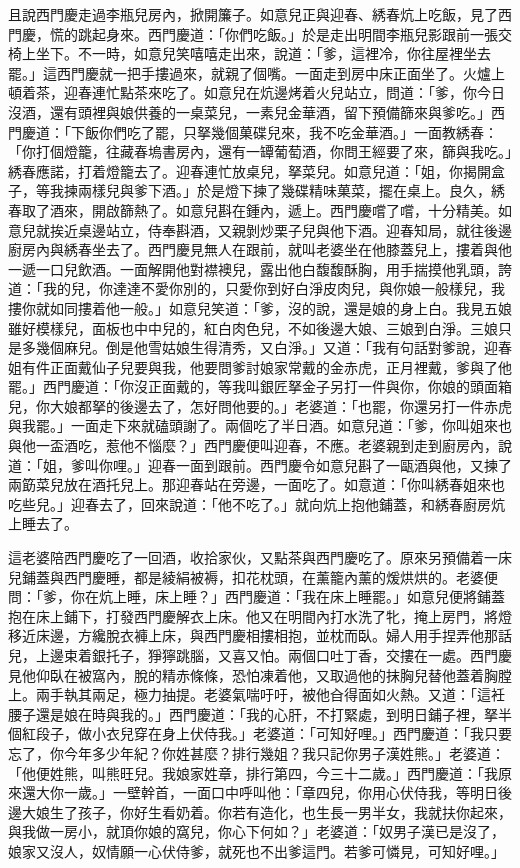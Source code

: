 且說西門慶走過李瓶兒房內，掀開簾子。如意兒正與迎春、綉春炕上吃飯，見了西門慶，慌的跳起身來。西門慶道：「你們吃飯。」於是走出明間李瓶兒影跟前一張交椅上坐下。不一時，如意兒笑嘻嘻走出來，說道：「爹，這裡冷，你往屋裡坐去罷。」這西門慶就一把手摟過來，就親了個嘴。一面走到房中床正面坐了。火爐上頓着茶，迎春連忙點茶來吃了。如意兒在炕邊烤着火兒站立，問道：「爹，你今日沒酒，還有頭裡與娘供養的一桌菜兒，一素兒金華酒，留下預備篩來與爹吃。」西門慶道：「下飯你們吃了罷，只拏幾個菓碟兒來，我不吃金華酒。」一面教綉春：「你打個燈籠，往藏春塢書房內，還有一罈葡萄酒，你問王經要了來，篩與我吃。」綉春應諾，打着燈籠去了。迎春連忙放桌兒，拏菜兒。如意兒道：「姐，你揭開盒子，等我揀兩樣兒與爹下酒。」於是燈下揀了幾碟精味菓菜，擺在桌上。良久，綉春取了酒來，開啟篩熱了。如意兒斟在鍾內，遞上。西門慶嚐了嚐，十分精美。如意兒就挨近桌邊站立，侍奉斟酒，又親剝炒栗子兒與他下酒。迎春知局，就往後邊廚房內與綉春坐去了。西門慶見無人在跟前，就叫老婆坐在他膝蓋兒上，摟着與他一遞一口兒飲酒。{}一面解開他對襟襖兒，露出他白馥馥酥胸，用手揣摸他乳頭，誇道：「我的兒，你達達不愛你別的，只愛你到好白淨皮肉兒，與你娘一般樣兒，我摟你就如同摟着他一般。」如意兒笑道：「爹，沒的說，還是娘的身上白。我見五娘雖好模樣兒，面板也中中兒的，紅白肉色兒，不如後邊大娘、三娘到白淨。三娘只是多幾個麻兒。倒是他雪姑娘生得清秀，又白淨。」{}又道：「我有句話對爹說，迎春姐有件正面戴仙子兒要與我，他要問爹討娘家常戴的金赤虎，正月裡戴，爹與了他罷。」西門慶道：「你沒正面戴的，等我叫銀匠拏金子另打一件與你，你娘的頭面箱兒，你大娘都拏的後邊去了，怎好問他要的。」老婆道：「也罷，你還另打一件赤虎與我罷。」一面走下來就磕頭謝了。兩個吃了半日酒。如意兒道：「爹，你叫姐來也與他一盃酒吃，惹他不惱麼？」西門慶便叫迎春，不應。老婆親到走到廚房內，說道：「姐，爹叫你哩。」迎春一面到跟前。西門慶令如意兒斟了一甌酒與他，又揀了兩筯菜兒放在酒托兒上。那迎春站在旁邊，一面吃了。如意道：「你叫綉春姐來也吃些兒。」迎春去了，回來說道：「他不吃了。」就向炕上抱他鋪蓋，和綉春廚房炕上睡去了。

這老婆陪西門慶吃了一回酒，收拾家伙，又點茶與西門慶吃了。原來另預備着一床兒鋪蓋與西門慶睡，都是綾絹被褥，扣花枕頭，在薰籠內薰的煖烘烘的。老婆便問：「爹，你在炕上睡，床上睡？」西門慶道：「我在床上睡罷。」如意兒便將鋪蓋抱在床上鋪下，打發西門慶解衣上床。他又在明間內打水洗了牝，掩上房門，將燈移近床邊，方纔脫衣褲上床，與西門慶相摟相抱，並枕而臥。婦人用手捏弄他那話兒，上邊束着銀托子，猙獰跳腦，又喜又怕。兩個口吐丁香，交摟在一處。西門慶見他仰臥在被窩內，脫的精赤條條，恐怕凍着他，又取過他的抹胸兒替他蓋着胸膛上。兩手執其兩足，極力抽提。老婆氣喘吁吁，被他㒲得面如火熱。又道：「這衽腰子還是娘在時與我的。」西門慶道：「我的心肝，不打緊處，到明日鋪子裡，拏半個紅段子，做小衣兒穿在身上伏侍我。」老婆道：「可知好哩。」西門慶道：「我只要忘了，你今年多少年紀？你姓甚麼？排行幾姐？我只記你男子漢姓熊。」老婆道：「他便姓熊，叫熊旺兒。我娘家姓章，排行第四，今三十二歲。」西門慶道：「我原來還大你一歲。」一壁幹首，一面口中呼叫他：「章四兒，你用心伏侍我，等明日後邊大娘生了孩子，你好生看奶着。你若有造化，也生長一男半女，我就扶你起來，與我做一房小，就頂你娘的窩兒，你心下何如？」老婆道：「奴男子漢已是沒了，娘家又沒人，奴情願一心伏侍爹，就死也不出爹這門。若爹可憐見，可知好哩。」

